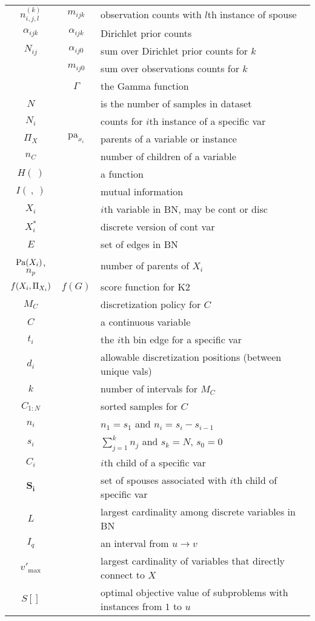 \begin{table}[H]
\begin{tabular}{@{}ccl@{}}
    $n_{i,j,l}^{(k)}$ & $m_{ijk}$ & observation counts with $l$th instance of spouse\\
    $\alpha_{ijk}$ & $\alpha_{ijk}$ & Dirichlet prior counts \\
    $N_{ij}$ & $\alpha_{ij0}$ & sum over Dirichlet prior counts for $k$ \\
        & $m_{ij0}$ & sum over observations counts for $k$ \\
        & $\Gamma$ & the Gamma function \\
    $N$ &          & is the number of samples in dataset \\
    $N_i$ &          & counts for $i$th instance of a specific var \\
    $\Pi_X$ & $\text{pa}_{x_i}$ & parents of a variable or instance \\
    $n_C$ & & number of children of a variable \\
    $H(~)$ & & a function \\
    $I(~,~)$ & & mutual information \\
    $X_i$ & & $i$th variable in BN, may be cont or disc \\
    $X_i^*$ & & discrete version of cont var \\
    $E$ & & set of edges in BN \\
    $\text{Pa}\paren{X_i}$, $n_p$ & & number of parents of $X_i$ \\
    $f\paren{X_i, \Pi_{X_i}}$ & $f(G)$ & score function for K2 \\
    $M_C$ & & discretization policy for $C$ \\
    $C$ & & a continuous variable \\
    $t_i$ & & the $i$th bin edge for a specific var \\
    $d_i$ & & allowable discretization positions (between unique vals) \\
    $k$ & & number of intervals for $M_C$ \\
    $C_{1:N}$ & & sorted samples for $C$ \\
    $n_i$ & & $n_1 = s_1$ and $n_i = s_{i} - s_{i-1}$ \\
    $s_i$ & & $\sum_{j=1}^k n_j$ and $s_k = N$, $s_0 = 0$ \\
    $C_i$ & & $i$th child of a specific var \\
    $\boldsymbol{S_i}$ & & set of spouses associated with $i$th child of specific var \\
    $L$ & & largest cardinality among discrete variables in BN \\
    $I_q$ & & an interval from $u \rightarrow v$ \\
    $v'_\text{max}$ & & largest cardinality of variables that directly connect to $X$ \\
    $S[]$ & &  optimal objective value of subproblems with instances from $1$ to $u$ \\
    \bottomrule
  \end{tabular}
\end{table}

